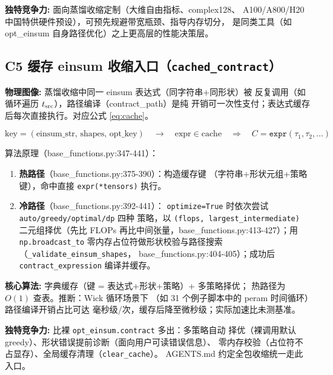 \documentclass[UTF8]{ctexart}
\begin{document}
\textbf{独特竞争力:} 面向蒸馏收缩定制（大维自由指标、complex128、
A100/A800/H20 中国特供硬件预设），可预先规避带宽瓶颈、指导内存切分，
是同类工具（如 opt\_einsum 自身路径优化）之上更高层的性能决策层。

\subsection{C5 缓存 einsum 收缩入口（\texttt{cached\_contract}）}

\begin{physbox}
\textbf{物理图像:} 蒸馏收缩中同一 einsum 表达式（同字符串+同形状）被
反复调用（如循环遍历 $t_{\rm src}$），路径编译（contract\_path）是纯
开销可一次性支付；表达式缓存后每次直接执行。对应公式 \eqref{eq:cache}。
\end{physbox}

\begin{equation}\label{eq:cache}
\text{key} = (\text{einsum\_str},\, \text{shapes},\, \text{opt\_key})
\quad\longrightarrow\quad
\text{expr} \in \text{cache}
\quad\Longrightarrow\quad
C = \texttt{expr}(\tau_1, \tau_2, \dots)
\end{equation}

算法原理（base\_functions.py:347-441）：

\begin{enumerate}
\item \textbf{热路径}（base\_functions.py:375-390）：构造缓存键
（字符串+形状元组+策略键），命中直接 \texttt{expr(*tensors)} 执行。
\item \textbf{冷路径}（base\_functions.py:392-441）：
\texttt{optimize=True} 时依次尝试 \texttt{auto/greedy/optimal/dp} 四种
策略，以 \texttt{(flops, largest\_intermediate)} 二元组择优（先比 FLOPs
再比中间张量，base\_functions.py:413-427）；用 \texttt{np.broadcast\_to}
零内存占位符做形状校验与路径搜索（\texttt{\_validate\_einsum\_shapes}，
base\_functions.py:404-405）；成功后 \texttt{contract\_expression}
编译并缓存。
\end{enumerate}

\begin{algobox}
\textbf{核心算法:} 字典缓存（键 = 表达式+形状+策略）+ 多策略择优；
热路径为 $O(1)$ 查表。\textcolor{phys}{推断}：Wick 循环场景下
（如 31 个例子脚本中的 peram 时间循环）路径编译开销占比可达
毫秒级/次，缓存后降至微秒级；实际加速比未测基准。
\end{algobox}

\textbf{独特竞争力:} 比裸 \texttt{opt\_einsum.contract} 多出：多策略自动
择优（裸调用默认 greedy）、形状错误提前诊断（面向用户可读错误信息）、
零内存校验（占位符不占显存）、全局缓存清理（\texttt{clear\_cache}）。
AGENTS.md 约定全包收缩统一走此入口。
\end{document}

